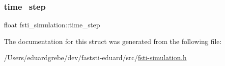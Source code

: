 \mbox{\label{structfsti__simulation_a650011fbab62704c39b65cdd8cdb3a3d}} 
\subsubsection{\texorpdfstring{time\+\_\+step}{time\_step}}
{\footnotesize\ttfamily float fsti\+\_\+simulation\+::time\+\_\+step}



The documentation for this struct was generated from the following file\+:\begin{DoxyCompactItemize}
\item 
/\+Users/eduardgrebe/dev/faststi-\/eduard/src/\mbox{\hyperlink{fsti-simulation_8h}{fsti-\/simulation.\+h}}\end{DoxyCompactItemize}
